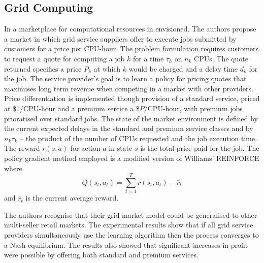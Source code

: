 \subsection{Grid Computing}
In \cite{vengerov:grid} a marketplace for computational resources in
envisioned.  The authors propose a market in which grid service suppliers offer
to execute jobs submitted by customers for a price per CPU-hour.  The problem
formulation requires customers to request a quote for computing a job $k$ for a
time $\tau_k$ on $n_k$ CPUs.  The quote returned specifies a price $P_k$ at
which $k$ would be charged and a delay time $d_k$ for the job.  The service
provider's goal is to learn a policy for pricing quotes that maximises long
term revenue when competing in a market with other providers.  Price
differentiation is implemented though provision of a standard service, priced
at \$1/CPU-hour and a premium sercice a \$$P$/CPU-hour, with premium jobs
prioratised over standard jobs.  The state of the market environment is
defined by the current expected delays in the standard and premium service
classes and by $n_k \tau_k$ -- the product of the number of CPUs requested and
the job execution time.  The reward $r(s,a)$ for action $a$ in state $s$ is the
total price paid for the job.  The policy gradient method employed is a
modified version of Williams' REINFORCE where
\begin{equation}
Q(s_t,a_t) = \sum_{t=1}^T r(s_t,a_t) - \overline{r}_t
\end{equation}
and $\overline{r}_t$ is the current average reward.

The authors recognise that their grid market model could be generalised to
other multi-seller retail markets.  The experimental results show that if
all grid service providers simultaneously use the learning algorithm then the
process converges to a Nash equilibrium.  The results also showed that
significant increases in profit were possible by offering both standard and
premium services.


